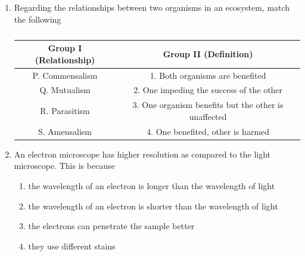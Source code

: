 \documentclass[journal,12pt,onecolumn]{IEEEtran}
\theoremstyle{remark}
\begin{document}
\begin{enumerate}
    \hfill{}

    \begin{enumerate}
    \end{enumerate}

\item Regarding the relationships between two organisms in an ecosystem, match the following

\begin{table}[h!]
\centering
\begin{tabular}{|c|c|}
\hline
\textbf{Group I (Relationship)} & \textbf{Group II (Definition)} \\
\hline
P. Commensalism & 1. Both organisms are benefited \\
Q. Mutualism & 2. One impeding the success of the other \\
R. Parasitism & 3. One organism benefits but the other is unaffected \\
S. Amensalism & 4. One benefited, other is harmed \\
\hline
\end{tabular}
\caption*{}
\label{tab:q15}
\end{table}
\hfill{}
\begin{enumerate}
\end{enumerate}

\item An electron microscope has higher resolution as compared to the light microscope. This is because

\hfill{}

\begin{enumerate}
\item the wavelength of an electron is longer than the wavelength of light
\item the wavelength of an electron is shorter than the wavelength of light
\item the electrons can penetrate the sample better
\item they use different stains
\end{enumerate}


\end{enumerate}
\end{document}
